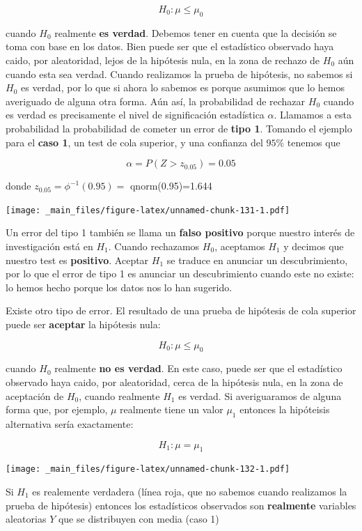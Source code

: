 \documentclass[
]{book}
\begin{document}
\[H_0: \mu\leq\mu_0\]

cuando \(H_0\) realmente \textbf{es verdad}. Debemos tener en cuenta que la decisión se toma con base en los datos. Bien puede ser que el estadístico observado haya caido, por aleatoridad, lejos de la hipótesis nula, en la zona de rechazo de \(H_0\) aún cuando esta sea verdad. Cuando realizamos la prueba de hipótesis, no sabemos si \(H_0\) es verdad, por lo que si ahora lo sabemos es porque asumimos que lo hemos averiguado de alguna otra forma. Aún así, la probabilidad de rechazar \(H_0\) cuando es verdad es precisamente el nivel de significación estadística \(\alpha\). Llamamos a esta probabilidad la probabilidad de cometer un error de \textbf{tipo 1}. Tomando el ejemplo para el \textbf{caso 1}, un test de cola superior, y una confianza del \(95\%\) tenemos que

\[\alpha = P(Z> z_{0.05})=0.05\]

donde \(z_{0.05}=\phi^{-1}(0.95)=\) qnorm(0.95)=1.644

\texttt{[image: \_main\_files/figure-latex/unnamed-chunk-131-1.pdf]}

Un error del tipo 1 también se llama un \textbf{falso positivo} porque nuestro interés de investigación está en \(H_1\). Cuando rechazamos \(H_0\), aceptamos \(H_1\) y decimos que nuestro test es \textbf{positivo}. Aceptar \(H_1\) se traduce en anunciar un descubrimiento, por lo que el error de tipo 1 es anunciar un descubrimiento cuando este no existe: lo hemos hecho porque los datos nos lo han sugerido.

Existe otro tipo de error. El resultado de una prueba de hipótesis de cola superior puede ser \textbf{aceptar} la hipótesis nula:

\[H_0: \mu\leq\mu_0\]

cuando \(H_0\) realmente \textbf{no es verdad}. En este caso, puede ser que el estadístico observado haya caido, por aleatoridad, cerca de la hipótesis nula, en la zona de aceptación de \(H_0\), cuando realmente \(H_1\) es verdad. Si averiguaramos de alguna forma que, por ejemplo, \(\mu\) realmente tiene un valor \(\mu_1\) entonces la hipóteisis alternativa sería exactamente:

\[H_1: \mu=\mu_1\]

\texttt{[image: \_main\_files/figure-latex/unnamed-chunk-132-1.pdf]}

Si \(H_1\) es realemente verdadera (línea roja, que no sabemos cuando realizamos la prueba de hipótesis) entonces los estadísticos observados son \textbf{realmente} variables aleatorias \(Y\) que se distribuyen con media (caso 1)
\end{document}

